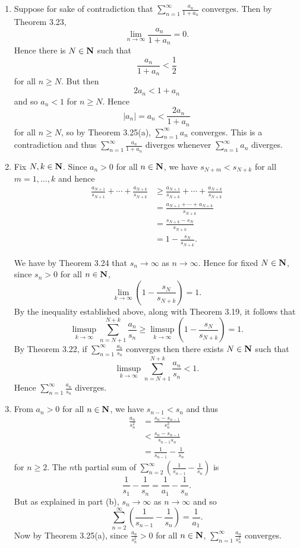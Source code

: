 \begin{ex}
\begin{enumerate}
\item Suppose for sake of contradiction that $\sum_{n = 1}^{\infty}\frac{a_n}{1+a_n}$ converges. Then by Theorem 3.23, \[\lim_{n\to\infty}\frac{a_n}{1+a_n} = 0.\] Hence there is $N \in \mathbf{N}$ such that \[\frac{a_n}{1+a_n} < \frac{1}{2}\] for all $n \geq N$. But then \[2a_n < 1 + a_n\] and so $a_n < 1$ for $n \geq N$. Hence \[|a_n| = a_n < \frac{2a_n}{1+a_n}\] for all $n \geq N$, so by Theorem 3.25(a), $\sum_{n=1}^{\infty}a_n$ converges. This is a contradiction and thus $\sum_{n=1}^{\infty}\frac{a_n}{1+a_n}$ diverges whenever $\sum_{n=1}^{\infty}a_n$ diverges.

\item Fix $N, k \in \mathbf{N}$. Since $a_n > 0$ for all $n \in \mathbf{N}$, we have $s_{N+m} < s_{N+k}$ for all $m = 1, \ldots, k$ and hence
\begin{align*}
\frac{a_{N+1}}{s_{N+1}} + \cdots + \frac{a_{N+k}}{s_{N+k}} & \geq \frac{a_{N+1}}{s_{N+k}} + \cdots + \frac{a_{N+k}}{s_{N+k}}\\
& = \frac{a_{N+1} + \cdots + a_{N+k}}{s_{N+k}}\\
& = \frac{s_{N+k}-s_N}{s_{N+k}}\\
& = 1 - \frac{s_N}{s_{N+k}}.
\end{align*}

We have by Theorem 3.24 that $s_n \to \infty$ as $n \to \infty$. Hence for fixed $N \in \mathbf{N}$, since $s_n > 0$ for all $n \in \mathbf{N}$, \[\lim_{k\to\infty}\left(1 - \frac{s_N}{s_{N+k}}\right) = 1.\] By the inequality established above, along with Theorem 3.19, it follows that \[\limsup_{k\to\infty}\sum_{n = N+1}^{N+k}\frac{a_n}{s_n} \geq \limsup_{k\to\infty}\left(1 - \frac{s_N}{s_{N+k}}\right) = 1.\] By Theorem 3.22, if $\sum_{n=1}^{\infty}\frac{a_n}{s_n}$ converges then there exists $N \in \mathbf{N}$ such that \[\limsup_{k\to\infty}\sum_{n = N+1}^{N+k}\frac{a_n}{s_n} < 1.\] Hence $\sum_{n=1}^{\infty}\frac{a_n}{s_n}$ diverges.

\item From $a_n > 0$ for all $n \in \mathbf{N}$, we have $s_{n-1} < s_n$ and thus
\begin{align*}
\frac{a_n}{s_n^2} & = \frac{s_n - s_{n-1}}{s_n^2}\\
& < \frac{s_n-s_{n-1}}{s_{n-1}s_n}\\
& = \frac{1}{s_{n-1}} - \frac{1}{s_n}
\end{align*}
for $n \geq 2$. The $n$th partial sum of $\sum_{n=2}^{\infty}\left(\frac{1}{s_{n-1}}-\frac{1}{s_n}\right)$ is \[\frac{1}{s_1} - \frac{1}{s_n} = \frac{1}{a_1} - \frac{1}{s_n}.\] But as explained in part (b), $s_n \to \infty$ as $n \to \infty$ and so \[\sum_{n = 2}^{\infty}\left(\frac{1}{s_{n-1}} - \frac{1}{s_n}\right) = \frac{1}{a_1}.\] Now by Theorem 3.25(a), since $\frac{a_n}{s_n^2} > 0$ for all $n \in \mathbf{N}$, $\sum_{n = 1}^{\infty}\frac{a_n}{s_n^2}$ converges.


\end{enumerate}
\end{ex}
